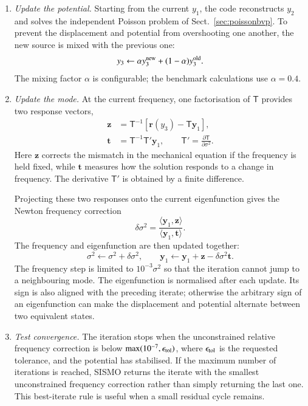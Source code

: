 \documentclass[]{aa}
\begin{document}
\begin{enumerate}
\item \emph{Update the potential.}
Starting from the current $y_1$, the code reconstructs $y_2$ and solves the independent Poisson problem of Sect.~\ref{sec:poissonbvp}. To prevent the displacement and potential from overshooting one another, the new source is mixed with the previous one:
\begin{equation}
y_3
\leftarrow
\alpha y_3^{\rm new}
+(1-\alpha)y_3^{\rm old}.
\end{equation}
The mixing factor $\alpha$ is configurable; the benchmark calculations use $\alpha=0.4$.

\item \emph{Update the mode.}
At the current frequency, one factorisation of $\mathsf{T}$ provides two response vectors,
\begin{align}
\mathbf{z}
&=
\mathsf{T}^{-1}
\left[
\mathbf{r}(y_3)-\mathsf{T}\mathbf{y}_1
\right], \nonumber\\
\mathbf{t}
&=
\mathsf{T}^{-1}\mathsf{T}'\mathbf{y}_1,
\qquad
\mathsf{T}'=
\frac{\partial\mathsf{T}}{\partial\sigma^2}.
\end{align}
Here $\mathbf{z}$ corrects the mismatch in the mechanical equation if the frequency is held fixed, while $\mathbf{t}$ measures how the solution responds to a change in frequency. The derivative $\mathsf{T}'$ is obtained by a finite difference.

Projecting these two responses onto the current eigenfunction gives the Newton frequency correction
\begin{equation}
\delta\sigma^2
=
\frac{\langle\mathbf{y}_1,\mathbf{z}\rangle}
     {\langle\mathbf{y}_1,\mathbf{t}\rangle}.
\end{equation}
The frequency and eigenfunction are then updated together:
\begin{equation}
\sigma^2
\leftarrow
\sigma^2+\delta\sigma^2,
\qquad
\mathbf{y}_1
\leftarrow
\mathbf{y}_1+\mathbf{z}-\delta\sigma^2\mathbf{t}.
\end{equation}
The frequency step is limited to $10^{-3}\sigma^2$ so that the iteration cannot jump to a neighbouring mode. The eigenfunction is normalised after each update. Its sign is also aligned with the preceding iterate; otherwise the arbitrary sign of an eigenfunction can make the displacement and potential alternate between two equivalent states.

\item \emph{Test convergence.}
The iteration stops when the unconstrained relative frequency correction is below $\max(10^{-7},\epsilon_{\rm tol})$, where $\epsilon_{\rm tol}$ is the requested tolerance, and the potential has stabilised. If the maximum number of iterations is reached, SISMO returns the iterate with the smallest unconstrained frequency correction rather than simply returning the last one. This best-iterate rule is useful when a small residual cycle remains.
\end{enumerate}
\end{document}
